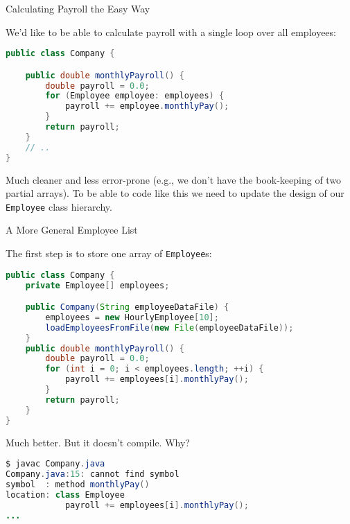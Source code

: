 \documentclass{beamer}
\begin{document}
\begin{frame}[fragile]{Calculating Payroll the Easy Way}


We'd like to be able to calculate payroll with a single loop over all employees:
\begin{lstlisting}[language=Java]
public class Company {

    public double monthlyPayroll() {
        double payroll = 0.0;
        for (Employee employee: employees) {
            payroll += employee.monthlyPay();
        }
        return payroll;
    }
    // ..
}
\end{lstlisting}

Much cleaner and less error-prone (e.g., we don't have the book-keeping of two partial arrays).  To be able to code like this we need to update the design of our {\tt Employee} class hierarchy.



\end{frame}

\begin{frame}[fragile]{A More General Employee List}


The first step is to store one array of {\tt Employee}s:
\vspace{-.05in}
\begin{lstlisting}[language=Java]
public class Company {
    private Employee[] employees;

    public Company(String employeeDataFile) {
        employees = new HourlyEmployee[10];
        loadEmployeesFromFile(new File(employeeDataFile));
    }
    public double monthlyPayroll() {
        double payroll = 0.0;
        for (int i = 0; i < employees.length; ++i) {
            payroll += employees[i].monthlyPay();
        }
        return payroll;
    }
}
\end{lstlisting}
\vspace{-.05in}
Much better.  But it doesn't compile.  Why?
\vspace{-.05in}
\begin{lstlisting}[language=Java]
$ javac Company.java
Company.java:15: cannot find symbol
symbol  : method monthlyPay()
location: class Employee
            payroll += employees[i].monthlyPay();
...
\end{lstlisting}

\end{frame}
\end{document}
